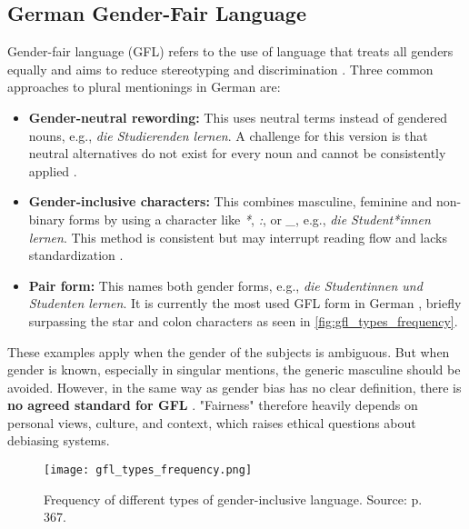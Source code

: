 \subsection{German Gender-Fair Language}
Gender-fair language (GFL) refers to the use of language that treats all genders equally and aims to reduce stereotyping and discrimination \citep{sczesnyCanGenderFairLanguage2016}. Three common approaches to plural mentionings in German are: 

\begin{itemize}
    \item \textbf{Gender-neutral rewording:}  
    This uses neutral terms instead of gendered nouns, e.g., \textit{die Studierenden lernen}. A challenge for this version is that neutral alternatives do not exist for every noun and cannot be consistently applied \citep{lardelliBuildingBridgesDataset2024}.

    \item \textbf{Gender-inclusive characters:}  
    This combines masculine, feminine and non-binary forms by using a character like \textit{*}, \textit{:}, or \textit{\_}, e.g., \textit{die Student*innen lernen}. This method is consistent but may interrupt reading flow and lacks standardization \citep{lardelliBuildingBridgesDataset2024}.

    \item \textbf{Pair form:}  
    This names both gender forms, e.g., \textit{die Studentinnen und Studenten lernen}. It is currently the most used GFL form in German \citep{waldendorfWordsChangeIncrease2024}, briefly surpassing the star and colon characters as seen in \autoref{fig:gfl_types_frequency}.
\end{itemize}

These examples apply when the gender of the subjects is ambiguous. But when gender is known, especially in singular mentions, the generic masculine should be avoided. However, in the same way as gender bias has no clear definition, there is \textbf{no agreed standard for GFL} \citep{lardelliBuildingBridgesDataset2024, savoldiDecadeGenderBias2025}. "Fairness" therefore heavily depends on personal views, culture, and context, which raises ethical questions about debiasing systems.

\begin{figure}
	\centering
		\texttt{[image: gfl\_types\_frequency.png]}
	\caption{Frequency of different types of gender-inclusive language. Source: \citet{waldendorfWordsChangeIncrease2024} p. 367.}
	\label{fig:gfl_types_frequency}
\end{figure}

